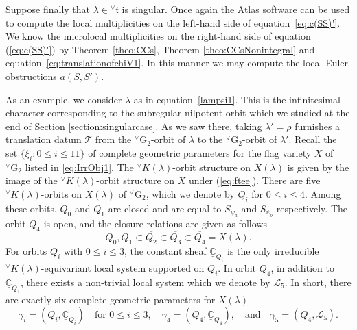 \documentclass[a4paper, 11pt]{article}
\begin{document}
Suppose finally that $\lambda \in {^\vee}\mathfrak{t}$ is singular. 
Once again the
Atlas software can be used to compute the local
multiplicities  on the left-hand side of equation~\eqref{eq:c(SS)'}.
We know the microlocal multiplicities on the right-hand side of
equation (\ref{eq:c(SS)'}) by  Theorem \ref{theo:CCs}, Theorem
\ref{theo:CCsNonintegral} and equation~\eqref{eq:translationofchiV1}.
In this manner we may compute the local Euler obstructions $a(S,
S')$.

As an example, we consider $\lambda$ as in equation~\eqref{lampsi1}. 
This is the infinitesimal character corresponding to the subregular
nilpotent orbit  
which we studied at the end of Section \ref{section:singularcase}. 
As we saw there,
taking
\(\lambda' = \rho\) furnishes  a translation datum
\(\mathcal{T}\) from the  ${}^{\vee}\mathrm{G}_2$-orbit of \(\lambda\)
to the ${}^{\vee}\mathrm{G}_2$-orbit of \(\lambda'\).   
Recall the set \(\{\xi_i : 0 \leq i \leq 11\}\) of complete geometric
parameters for the flag variety $X$ of ${}^{\vee}\mathrm{G}_2$ listed in
\eqref{eq:IrrObj1}.  
The
${^\vee}K(\lambda)$-orbit structure on $X(\lambda)$ is given by the
image of the ${^\vee}K(\lambda)$-orbit structure on $X$ under (\ref{eq:ftee}).
There are five ${}^{\vee}K(\lambda)$-orbits on $X(\lambda)$ of
${}^{\vee}\mathrm{G}_2$, which we denote by $Q_i$ for $0 \leq i \leq 4$.  
Among these orbits, $Q_0$ and $Q_1$ are closed and are equal to
$S_{\psi_a}$ and $S_{\psi_b}$ respectively.
The orbit $Q_4$ is open,  
and the closure relations are given as follows
\[
Q_0, Q_1 \subset \overline{Q_2} \subset \overline{Q_3} \subset
\overline{Q_4} = X(\lambda).
\] 
For orbits $Q_i$ with $0 \leq i \leq 3$, the constant sheaf
\(\underline{\mathbb{C}}_{Q_i}\) is the only irreducible
${}^{\vee}K(\lambda)$-equivariant local system supported on \(Q_i\).   
In orbit $Q_4$, in addition to \(\underline{\mathbb{C}}_{Q_4}\), there
exists a non-trivial local system which we denote by
\(\mathcal{L}_5\).   
In short, there are exactly six complete geometric parameters for
$X(\lambda)$
\[
\gamma_i = (Q_i, \underline{\mathbb{C}}_{Q_i}) \quad \text{for } 0
\leq i \leq 3, \quad\gamma_4 = (Q_4, \underline{\mathbb{C}}_{Q_4}),
\quad  \text{and} \quad \gamma_5 = (Q_4, \mathcal{L}_5). 
\]
 
\end{document}

